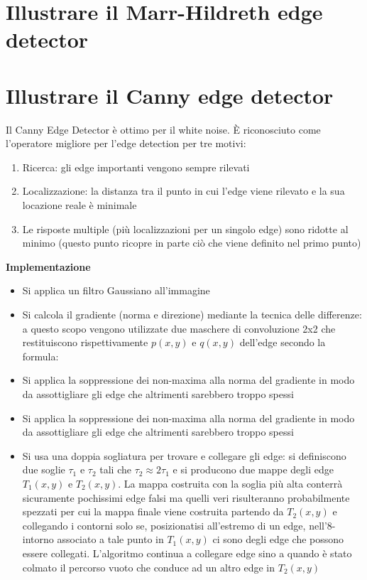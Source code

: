 \section{Illustrare il Marr-Hildreth edge detector}

\section{Illustrare il Canny edge detector}
Il Canny Edge Detector è ottimo per il white noise. È riconosciuto come l'operatore migliore per l'edge detection per tre motivi:
\begin{enumerate}
	\item Ricerca: gli edge importanti vengono sempre rilevati
	\item Localizzazione: la distanza tra il punto in cui l'edge viene rilevato e la sua locazione reale è minimale
	\item Le risposte multiple (più localizzazioni per un singolo edge) sono ridotte al minimo (questo punto ricopre in parte ciò che viene definito nel primo punto)
\end{enumerate}

\textbf{Implementazione}
\begin{itemize}
	\item Si applica un filtro Gaussiano all'immagine
	
	\item Si calcola il gradiente (norma e direzione) mediante la tecnica delle differenze: a questo scopo vengono utilizzate due maschere di convoluzione 2x2 che restituiscono rispettivamente $p(x,y)$ e $q(x,y)$ dell'edge secondo la formula:
	
	\item Si applica la soppressione dei non-maxima alla norma del gradiente in modo da assottigliare
	gli edge che altrimenti sarebbero troppo spessi
	
	
	\item Si applica la soppressione dei non-maxima alla norma del gradiente in modo da assottigliare gli edge che altrimenti sarebbero troppo spessi
	
	\item Si usa una doppia sogliatura per trovare e collegare gli edge: si definiscono due soglie $\tau_1$ e $\tau_2$ tali che $\tau_2 \approx 2 \tau_1$ e si producono due mappe degli edge $T_1(x,y)$ e $T_2(x,y)$. La mappa costruita con la soglia più alta conterrà sicuramente pochissimi edge falsi ma quelli veri risulteranno probabilmente spezzati per cui la mappa finale viene costruita partendo da $T_2(x,y)$ e collegando i contorni solo se, posizionatisi all'estremo di un edge, nell'8-intorno associato a	tale punto in $T_1(x,y)$ ci sono degli edge che possono essere collegati. L'algoritmo continua a collegare edge sino a quando è stato colmato il percorso vuoto che conduce ad un altro edge in $T_2(x,y)$

\end{itemize}

